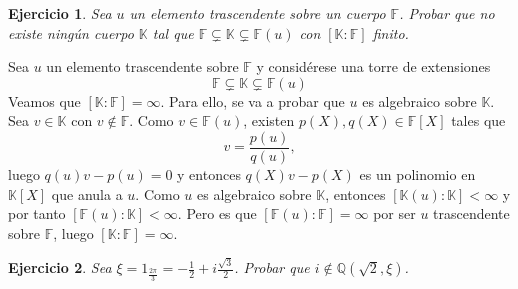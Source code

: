 \documentclass[11pt]{report}
\makeatletter
\renewenvironment{proof}[1][\proofname]{\par
  \pushQED{\qed}%
  \normalfont \topsep\z@skip %
  \trivlist
  \item[\hskip\labelsep
        \itshape
    #1\@addpunct{.}]\ignorespaces
}{%
  \popQED\endtrivlist\@endpefalse
}
\newcommand{\Q}{\mathbb Q}
\newcommand{\F}{\mathbb F}
\newcommand{\K}{\mathbb K}
\newtheorem{ejercicio}{Ejercicio}
\makeatother
\begin{document}
\begin{ejercicio}
    Sea $u$ un elemento trascendente sobre un cuerpo $\F$. Probar que no existe ningún cuerpo $\K$ tal que $\F \subsetneq \K \subsetneq \F(u)$ con $[\K \colon \F]$ finito.
\end{ejercicio}

\begin{proof}
    Sea $u$ un elemento trascendente sobre $\F$ y considérese una torre de extensiones
    \[\F \subsetneq \K \subsetneq \F(u)\]
    Veamos que $[\K \colon \F]=\infty $. Para ello, se va a probar que $u$ es algebraico sobre $\K$. Sea $v \in \K$ con $v \not\in \F$. Como $v \in \F(u)$, existen $p(X),q(X) \in \F[X]$ tales que
    \[v = \frac{p(u)}{q(u)},\]
    luego $q(u)v-p(u)=0$ y entonces $q(X)v-p(X)$ es un polinomio en $\K[X]$ que anula a $u$. Como $u$ es algebraico sobre $\K$, entonces $[\K(u) \colon \K] <\infty$ y por tanto $[\F(u) \colon \K] < \infty$. Pero es que $[\F(u) \colon \F]=\infty$ por ser $u$ trascendente sobre $\F$, luego $[\K \colon \F]=\infty$.
\end{proof}

\begin{ejercicio}
Sea $\xi = 1_{\frac{2\pi}{3}} = -\frac{1}{2}+i\frac{\sqrt{3}}{2}$. Probar que $i \not\in \Q(\sqrt{2},\xi)$.
\end{ejercicio}
\end{document}
